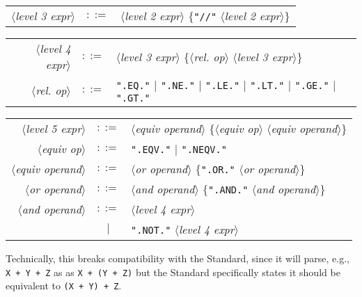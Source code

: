 \begin{tabular}{rcl}
  $\langle$\textit{level 3 expr}$\rangle$ & $::=$ & $\langle$\textit{level 2 expr}$\rangle$ $\{$\texttt{"//"} $\langle$\textit{level 2 expr}$\rangle\}$\\
\end{tabular}

\begin{tabular}{rcl}
  $\langle$\textit{level 4 expr}$\rangle$ & $::=$ & $\langle$\textit{level 3 expr}$\rangle$ $\{\langle$\textit{rel. op}$\rangle$ $\langle$\textit{level 3 expr}$\rangle\}$\\
  $\langle$\textit{rel. op}$\rangle$ & $::=$ & \texttt{".EQ."} $\mid$
  \texttt{".NE."} $\mid$
  \texttt{".LE."} $\mid$
   \texttt{".LT."} $\mid$
  \texttt{".GE."} $\mid$
   \texttt{".GT."}\\
\end{tabular}

\begin{tabular}{rcl}
  $\langle$\textit{level 5 expr}$\rangle$ & $::=$ & $\langle$\textit{equiv operand}$\rangle$ $\{\langle$\textit{equiv op}$\rangle$ $\langle$\textit{equiv operand}$\rangle\}$\\
  $\langle$\textit{equiv op}$\rangle$ & $::=$ & \texttt{".EQV."} $\mid$ \texttt{".NEQV."}\\
  $\langle$\textit{equiv operand}$\rangle$ & $::=$ & $\langle$\textit{or operand}$\rangle$
  $\{$\texttt{".OR."} $\langle$\textit{or operand}$\rangle\}$\\
  $\langle$\textit{or operand}$\rangle$ & $::=$ & $\langle$\textit{and operand}$\rangle$
  $\{$\texttt{".AND."} $\langle$\textit{and operand}$\rangle\}$\\
  $\langle$\textit{and operand}$\rangle$ & $::=$ & $\langle$\textit{level 4 expr}$\rangle$\\
  & $\mid$ & \texttt{".NOT."} $\langle$\textit{level 4 expr}$\rangle$\\
\end{tabular}

\medbreak
Technically, this breaks compatibility with the Standard, since it will
parse, e.g., \texttt{X + Y + Z} as 
as \texttt{X + (Y + Z)} but the Standard specifically states it should
be equivalent to \texttt{(X + Y) + Z}.

